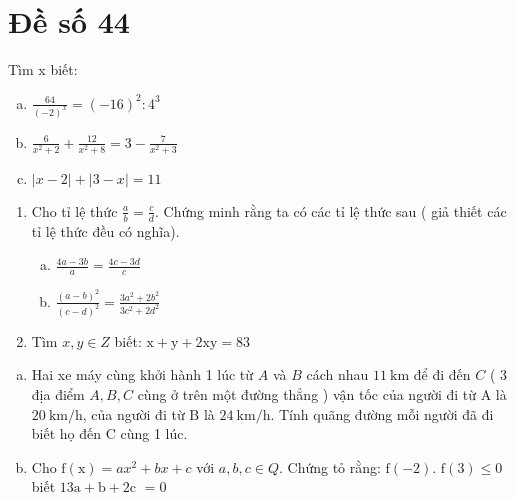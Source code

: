 \section{Đề số 44}

\begin{bt} 
	Tìm x biết:
	\begin{enumerate}[a.]
		\item $\frac{64}{(-2)^x}=(-16)^2: 4^3$
		\item $\frac{6}{x^2+2}+\frac{12}{x^2+8}=3-\frac{7}{x^2+3}$
		\item $|x-2|+|3-x|=11$
	\end{enumerate}
	\loigiai{} 
\end{bt}

\begin{bt}
	\hfill
	\begin{enumerate}[1.]
		\item Cho tỉ lệ thức $\frac{a}{b}=\frac{c}{d}$. Chứng minh rằng ta có các tỉ lệ thức sau ( giả thiết các tỉ lệ thức đều có nghĩa).
		\begin{enumerate}[a.]
			\item $\frac{4 a-3 b}{a}=\frac{4 c-3 d}{c}$
			\item $\frac{(a-b)^2}{(c-d)^2}=\frac{3 a^2+2 b^2}{3 c^2+2 d^2}$
		\end{enumerate}
		\item Tìm $x, y \in Z$ biết: $\mathrm{x}+\mathrm{y}+2 \mathrm{xy}=83$
	\end{enumerate}
	\loigiai{} 
\end{bt}

\begin{bt}
	\hfill
	\begin{enumerate}[a.]
		\item Hai xe máy cùng khởi hành 1 lúc từ $A$ và $B$ cách nhau $11 \mathrm{~km}$ để đi đến $C$ ( 3 địa điểm $A, B, C$ cùng ở trên một đường thẳng ) vận tốc của người đi từ $\mathrm{A}$ là $20 \mathrm{~km} / \mathrm{h}$, của người đi từ $\mathrm{B}$ là $24 \mathrm{~km} / \mathrm{h}$. Tính quãng đường mỗi người đã đi biết họ đến $\mathrm{C}$ cùng 1 lúc.
		\item Cho $\mathrm{f}(\mathrm{x})=a x^2+b x+c$ với $a, b, c \in Q$. Chứng tỏ rằng: $\mathrm{f}(-2)$. $\mathrm{f}(3) \leq 0$ biết $13 \mathrm{a}+\mathrm{b}+2 \mathrm{c}$ $=0$
	\end{enumerate}

	\loigiai{} 
\end{bt}

